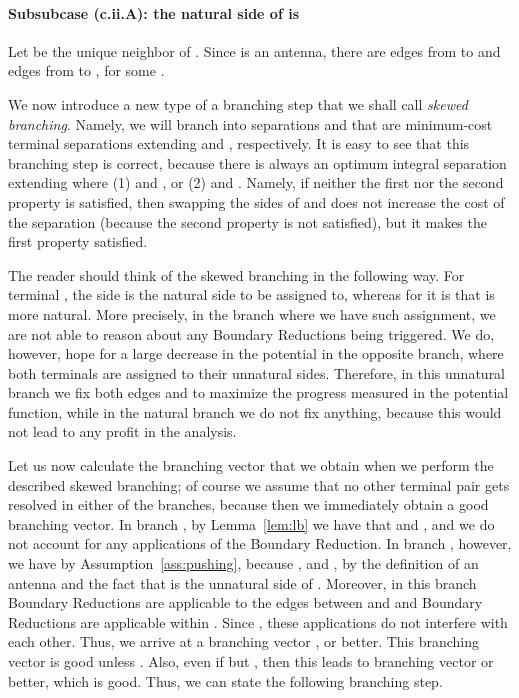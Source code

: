 \paragraph*{Subsubcase (c.ii.A): the natural side of  is }

Let  be the unique neighbor of . Since  is an antenna, there are  edges from  to  and  edges from  to , for some .

\newcommand{\Ant}{A_{\text{nt}}}
\newcommand{\Bnt}{B_{\text{nt}}}
\newcommand{\Aunt}{A_{\text{unt}}}
\newcommand{\Bunt}{B_{\text{unt}}}
\newcommand{\Auntext}{A_{\text{unt}}^{\text{ext}}}
\newcommand{\Buntext}{B_{\text{unt}}^{\text{ext}}}

We now introduce a new type of a branching step that we shall call {\em{skewed branching}}. Namely, we will branch into separations  and  that are minimum-cost terminal separations extending  and , respectively. It is easy to see that this branching step is correct, because there is always an optimum integral separation  extending  where (1)  and , or (2)  and . Namely, if neither the first nor the second property is satisfied, then swapping the sides of  and  does not increase the cost of the separation (because the second property is not satisfied), but it makes the first property satisfied.

The reader should think of the skewed branching in the following way. For terminal , the side  is the natural side to be assigned to, whereas for  it is  that is more natural. More precisely, in the branch where we have such assignment, we are not able to reason about any Boundary Reductions being triggered. We do, however, hope for a large decrease in the potential in the opposite branch, where both terminals are assigned to their unnatural sides. Therefore, in this unnatural branch we fix both edges  and  to maximize the progress measured in the potential function, while in the natural branch we do not fix anything, because this would not lead to any profit in the analysis.

Let us now calculate the branching vector that we obtain when we perform the described skewed branching; of course we assume that no other terminal pair gets resolved in either of the branches, because then we immediately obtain a good branching vector. In branch , by Lemma~\ref{lem:lb} we have that  and , and we do not account for any applications of the Boundary Reduction. In branch , however, we have  by Assumption~\ref{ass:pushing}, because , and , by the definition of an antenna and the fact that  is the unnatural side of . Moreover, in this branch  Boundary Reductions are applicable to the edges between  and  and  Boundary Reductions are applicable within . Since , these applications do not interfere with each other. Thus, we arrive at a branching vector , or better. This branching vector is good unless . Also, even if  but , then this leads to branching vector  or better, which is good. Thus, we can state the following branching step.

